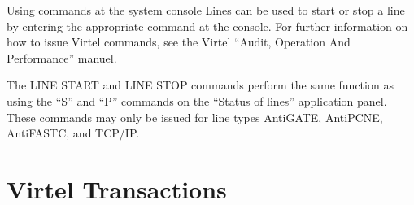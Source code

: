\documentclass[letterpaper,10pt,english]{sphinxmanual}
\begin{document}
\ignorespaces 
{}

Using commands at the system console Lines can be used to start or stop a line by entering the appropriate command at the console. For further information on how to issue Virtel commands, see the Virtel “Audit, Operation And Performance” manuel.

\begin{sphinxVerbatim}[commandchars=\\\{\}]
  
  

        
\end{sphinxVerbatim}

The LINE START and LINE STOP commands perform the same function as using the “S” and “P” commands on the “Status of lines” application panel. These commands may only be issued for line types AntiGATE, AntiPCNE, AntiFASTC, and TCP/IP.

\ignorespaces 

\chapter{Virtel Transactions}
\label{\detokenize{Customization:virtel-transactions}}\label{\detokenize{Customization:index-56}}
\ignorespaces 
\end{document}
